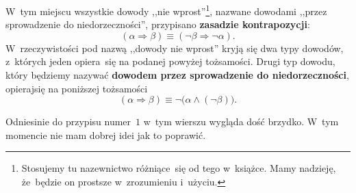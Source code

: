 \documentclass[a4paper,11pt]{article}
\begin{document}
 W~tym miejscu wszystkie dowody 
,,nie wprost''\footnote{Stosujemy tu nazewnictwo różniące~się od tego w~książce. 
Mamy nadzieję, że~będzie on prostsze w~zrozumieniu i~użyciu.}, nazwane dowodami 
,,przez sprowadzenie do niedorzeczności'', przypisano \textbf{zasadzie kontrapozycji}: 
\begin{equation}
  \label{eq:Kuratowski-Wstep-do-teorii-mnogosci-ETC-01}
  ( \alpha \Rightarrow \beta ) \equiv ( \neg \beta \Rightarrow \neg \alpha).
\end{equation}
W~rzeczywistości pod nazwą ,,dowody nie wprost'' kryją się dwa typy dowodów, z~których
jeden opiera~się na podanej powyżej tożsamości. Drugi typ dowodu, który będziemy nazywać 
\textbf{dowodem przez sprowadzenie do niedorzeczności}, opierajsię na poniższej tożsamości
\begin{equation}
  \label{eq:Kuratowski-Wstep-do-teorii-mnogosci-ETC-02}
  ( \alpha \Rightarrow \beta ) \equiv \neg \big( \alpha \land ( \neg \beta ) \big).
\end{equation}

\vspace{\spaceFour}





 Odniesinie do przypisu numer~$1$ w~tym wierszu wygląda dość brzydko. W~tym momencie 
nie mam dobrej idei jak to poprawić.



\vspace{\spaceFive}
\end{document}
